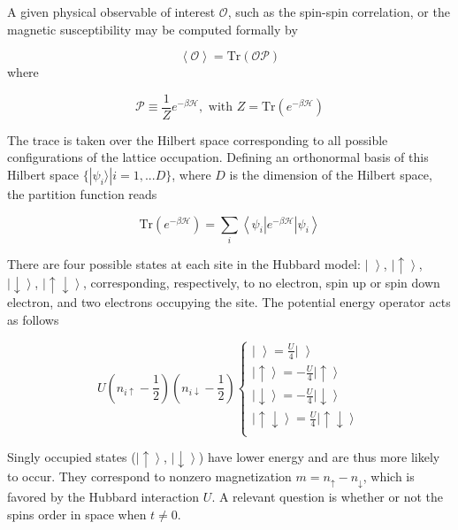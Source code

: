 \documentclass[10pt, twocolumn, twoside]{article}
\begin{document}
A given physical observable of interest $\mathcal{O}$, such as the spin-spin correlation, or the magnetic susceptibility may be computed formally by

\begin{equation}
\left\langle \mathcal{O} \right\rangle = \text{Tr} ( \mathcal{O} \mathcal{P} )
\end{equation}
where

\begin{equation}\label{eq:projection}
\mathcal{P} \equiv \frac{1}{Z} e^{-\beta \mathcal{H} } , \text{ with } Z = \text{Tr} ( e^{-\beta \mathcal{H} } )
\end{equation}

The trace is taken over the Hilbert space corresponding to all possible configurations of the lattice occupation. Defining an orthonormal basis of this Hilbert space $\{ | \psi_i \rangle | i = 1, ... D \} $, where $D$ is the dimension of the Hilbert space, the partition function reads

\begin{equation}\label{eq:z_asEigen}
\text{Tr} ( e^{-\beta \mathcal{H} } )= \sum_i \left\langle \psi_i | e^{-\beta \mathcal{H} } | \psi_i \right\rangle
\end{equation}

There are four possible states at each site in the Hubbard model: $\left| \,\, \right\rangle$, $\left|\uparrow \right\rangle$, $\left|\downarrow\right \rangle$, $\left|\uparrow \downarrow \right\rangle $, corresponding, respectively, to no electron, spin up or spin down electron, and two electrons occupying the site. The potential energy operator acts as follows

\begin{equation}
U (n_{i\uparrow} - \frac{1}{2} ) ( n_{i\downarrow} - \frac{1}{2} ) 
\begin{cases}
\left| \,\, \right\rangle = \frac{U}{4} \left| \,\, \right\rangle \\
\left|\uparrow \right\rangle = -\frac{U}{4} \left|\uparrow \right\rangle \\
\left|\downarrow\right \rangle = -\frac{U}{4} \left|\downarrow\right \rangle \\
\left|\uparrow \downarrow \right\rangle = \frac{U}{4} \left|\uparrow \downarrow \right\rangle \\
\end{cases}
\end{equation}

Singly occupied states ($\left|\uparrow \right\rangle$, $\left|\downarrow\right \rangle$) have lower energy and are thus more likely to occur. They correspond to nonzero magnetization $m = n_{\uparrow} - n_{\downarrow}$, which is favored by the Hubbard interaction $U$. A relevant question is whether or not the spins order in space when $t \neq 0$.
\end{document}
